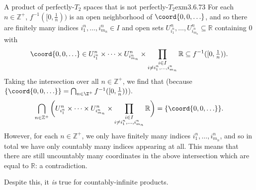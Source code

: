 \begin{exm}{A product of perfectly-$T_2$ spaces that is not perfectly-$T_2$}{exm3.6.73}
For each $n\in \mathbb{Z}^+$, $f^{-1}([0,\frac{1}{n}))$ is an open neighborhood of $\coord{0,0,\ldots}$, and so there are finitely many indices $i_1^n,\ldots ,i_{m_n}^n\in I$ and open sets $U_{i_1^n}^n,\ldots ,U_{i_{m_n}^n}^n\subseteq \mathbb{R}$ containing $0$ with
\begin{equation*}
\coord{0,0,\ldots}\in U_{i_1^n}^n\times \cdots \times U_{i_{m_n}^n}^n\times \prod _{\substack{i\in I \\ i\neq i_1^n,\ldots ,i_{m_n}^n}}\mathbb{R}\subseteq f^{-1}([0,\tfrac{1}{n})).
\end{equation*}
Taking the intersection over all $n\in \mathbb{Z}^+$, we find that (because $\{ \coord{0,0,\ldots}\} =\bigcap _{n\in \Z ^+}f^{-1}([0,\frac{1}{n}))$).
\begin{equation*}
\bigcap _{n\in \mathbb{Z}^+}\bigg( U_{i_1^n}^n\times \cdots \times U_{i_{m_n}^n}^n\times \prod _{\substack{i\in I \\ i\neq i_1^n,\ldots ,i_{m_n}^n}}\mathbb{R}\bigg) =\{ \coord{0,0,\ldots}\} .
\end{equation*}
However, for each $n\in \mathbb{Z}^+$, we only have finitely many indices $i_1^n,\ldots ,i_{m_n}^n$, and so in total we have only countably many indices appearing at all.  This means that there are still uncountably many coordinates in the above intersection which are equal to $\mathbb{R}$:  a contradiction.
\end{exm}
Despite this, it \emph{is} true for countably-infinite products.
